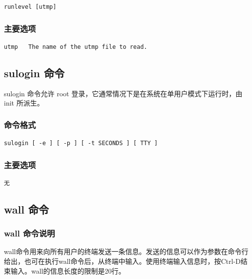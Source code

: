 {\begin{shaded}\begin{verbatim}
runlevel [utmp]
\end{verbatim}\end{shaded}}
\subsubsection{主要选项}

{\begin{shaded}\begin{verbatim}
utmp   The name of the utmp file to read.
\end{verbatim}\end{shaded}}
\subsection{sulogin 命令}

sulogin 命令允许 root 登录，它通常情况下是在系统在单用户模式下运行时，由
init 所派生。

\subsubsection{命令格式}

{\begin{shaded}\begin{verbatim}
sulogin [ -e ] [ -p ] [ -t SECONDS ] [ TTY ]
\end{verbatim}\end{shaded}}
\subsubsection{主要选项}

{\begin{shaded}\begin{verbatim}
无
\end{verbatim}\end{shaded}}
\subsection{wall 命令}

\subsubsection{wall 命令说明}

wall命令用来向所有用户的终端发送一条信息。发送的信息可以作为参数在命令行给出，也可在执行wall命令后，从终端中输入。使用终端输入信息时，按Ctrl-D结束输入。wall的信息长度的限制是20行。

